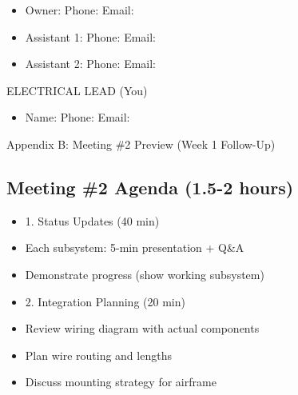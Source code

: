 \documentclass[11pt,letterpaper]{article}
\begin{document}
{\begin{itemize}
  \item Owner: \underline{\hspace{4.95cm}}  Phone: \underline{\hspace{1.95cm}}  Email: \underline{\hspace{2.4cm}}
  \item Assistant 1: \underline{\hspace{4.05cm}}  Phone: \underline{\hspace{1.95cm}}  Email: \underline{\hspace{2.4cm}}
  \item Assistant 2: \underline{\hspace{4.05cm}}  Phone: \underline{\hspace{1.95cm}}  Email: \underline{\hspace{2.4cm}}
\end{itemize}

ELECTRICAL LEAD (You)\par

\begin{itemize}
  \item Name: \underline{\hspace{5.1cm}}  Phone: \underline{\hspace{1.95cm}}  Email: \underline{\hspace{2.4cm}}
\end{itemize}

Appendix B: Meeting \#2 Preview (Week 1 Follow-Up)\par

\subsection{Meeting \#2 Agenda (1.5-2 hours)}

\begin{itemize}
  \item 1. Status Updates (40 min)
  \item Each subsystem: 5-min presentation + Q\&A
  \item Demonstrate progress (show working subsystem)
\end{itemize}

\begin{itemize}
  \item 2. Integration Planning (20 min)
  \item Review wiring diagram with actual components
  \item Plan wire routing and lengths
  \item Discuss mounting strategy for airframe
\end{itemize}

}
\end{document}
